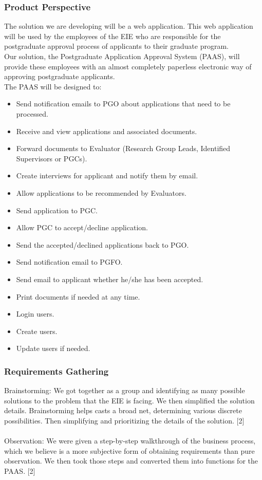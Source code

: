 \documentclass{article}
\begin{document}
\subsubsection{Product Perspective}
The solution we are developing will be a web application. This web application will be used by the employees of the EIE who are responsible for the postgraduate approval process of applicants to their graduate program. \\
Our solution, the Postgraduate Application Approval System (PAAS), will provide these employees with an almost completely paperless electronic way of approving postgraduate applicants. \\
The PAAS will be designed to:
\begin{itemize}
\item Send notification emails to PGO about applications that need to be processed.
\item Receive and view applications and associated documents.
\item Forward documents to Evaluator (Research Group Leads, Identified Supervisors or PGCs).
\item Create interviews for applicant and notify them by email.
\item Allow applications to be recommended by Evaluators.
\item Send application to PGC.
\item Allow PGC to accept/decline application.
\item Send the accepted/declined applications back to PGO.
\item Send notification email to PGFO.
\item Send email to applicant whether he/she has been accepted.
\item Print documents if needed at any time.
\item Login users.
\item Create users.
\item Update users if needed.
\end{itemize}
\subsubsection{Requirements Gathering}
Brainstorming: We got together as a group and identifying as many possible solutions to the problem that the EIE is facing. We then simplified the solution details. Brainstorming helps casts a broad net, determining various discrete possibilities. Then simplifying and prioritizing the details of the solution. [2] \\ \\
Observation: We were given a step-by-step walkthrough of the business process, which we believe is a more subjective form of obtaining requirements than pure observation. We then took those steps and converted them into functions for the PAAS. [2]
\end{document}
